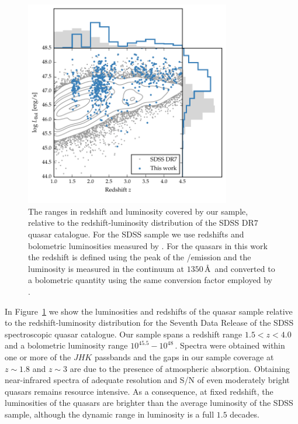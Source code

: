 \begin{figure}[h!]
    \centering
    \includegraphics[width=0.8\textwidth]{figures/chapter02/luminosity_z.pdf} 
    \caption[{The ranges in redshift and luminosity covered by our sample, relative to the redshift-luminosity distribution of the SDSS DR$7$ quasar catalogue.}]{The ranges in redshift and luminosity covered by our sample, relative to the redshift-luminosity distribution of the SDSS DR$7$ quasar catalogue. For the SDSS sample we use \citet{hewett10} redshifts and bolometric luminosities measured by \citet{shen11}. For the quasars in this work the redshift is defined using the peak of the \hans/\hb emission and the luminosity is measured in the continuum at $1350$\,\AA\, and converted to a bolometric quantity using the same conversion factor employed by \citet{shen11}.}     
    \label{fig:lzplane}
\end{figure}

In Figure~\ref{fig:lzplane} we show the luminosities and redshifts of the quasar sample relative to the redshift-luminosity distribution for the Seventh Data Release \citep[DR$7$;][]{schneider10} of the SDSS spectroscopic quasar catalogue.
Our sample spans a redshift range $1.5 < z < 4.0$ and a bolometric luminosity range $10^{45.5}-10^{48}$\,\ergs. 
Spectra were obtained within one or more of the $JHK$ passbands and the gaps in our sample coverage at $z\sim1.8$ and $z\sim3$ are due to the presence of atmospheric absorption. 
Obtaining near-infrared spectra of adequate resolution and S/N of even moderately bright quasars remains resource intensive. 
As a consequence, at fixed redshift, the luminosities of the quasars are brighter than the average luminosity of the SDSS sample, although the dynamic range in luminosity is a full $1.5$ decades.

